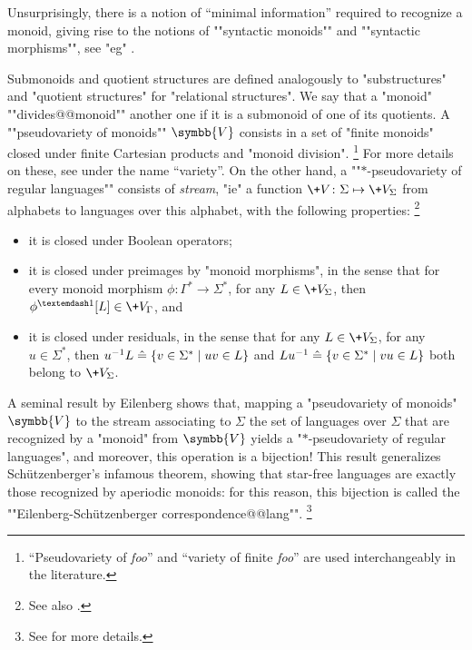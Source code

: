 Unsurprisingly, there is a notion of ``minimal information'' required to recognize a monoid,
giving rise to the notions of ""syntactic monoids"" and ""syntactic morphisms"",
see "eg" \cite[Theorem~1.7]{Bojanczyk2020MSO}.

Submonoids and quotient structures are defined analogously to
"substructures" and "quotient structures" for "relational structures".
We say that a "monoid" \AP""divides@@monoid"" another one if it is
a submonoid of one of its quotients.
A \AP""pseudovariety of monoids"" $\symbb{V}$%
consists in a set of "finite monoids" closed under finite Cartesian products
and "monoid division".%
\footnote{``Pseudovariety of \emph{foo}'' and ``variety of finite \emph{foo}''
are used interchangeably in the literature.}
For more details on these,
see \cite[\S XI.1, p.~189]{Pin2022MathematicalFoundations} under the name ``variety''.
On the other hand, a ""$\ast$-pseudovariety of regular languages""
consists of \emph{stream}, "ie" a function $\+V\colon \Sigma \mapsto \+V_{\Sigma}$ from alphabets to languages over this alphabet, with the following properties:%
\footnote{See also \cite[\S XIII.3, p.~226]{Pin2022MathematicalFoundations}.}
\begin{itemize}
	\item it is closed under Boolean operators;
	\item it is closed under preimages by "monoid morphisms", in the sense that
		for every monoid morphism $\phi\colon \Gamma^* \to \Sigma^*$, for any $L \in \+V_{\Sigma}$,
		then $\phi^{—1}[L] \in \+V_{\Gamma}$, and
	\item it is closed under residuals, in the sense that for any $L \in \+V_{\Sigma}$,
		for any $u\in\Sigma^*$, then
		$u^{-1}L \mathrel{\hat{=}} \{v \in \Sigma^* \mid uv \in L\}$
		and $Lu^{-1} \mathrel{\hat{=}} \{v \in \Sigma^* \mid vu \in L\}$
		both belong to $\+V_{\Sigma}$.
\end{itemize}
A seminal result by Eilenberg shows that, mapping a "pseudovariety of monoids" $\symbb{V}$
to the stream associating to $\Sigma$ the set of languages over $\Sigma$ that are recognized
by a "monoid" from $\symbb{V}$ yields a "$*$-pseudovariety of regular languages",
and moreover, this operation is a bijection!
This result generalizes Schützenberger's infamous theorem, showing that
star-free languages are exactly those recognized by aperiodic monoids:
for this reason, this bijection is called the \AP""Eilenberg-Schützenberger correspondence@@lang"".%
\footnote{See \cite[Theorem XIII.4.10, p.~228]{Pin2022MathematicalFoundations} for more details.}


